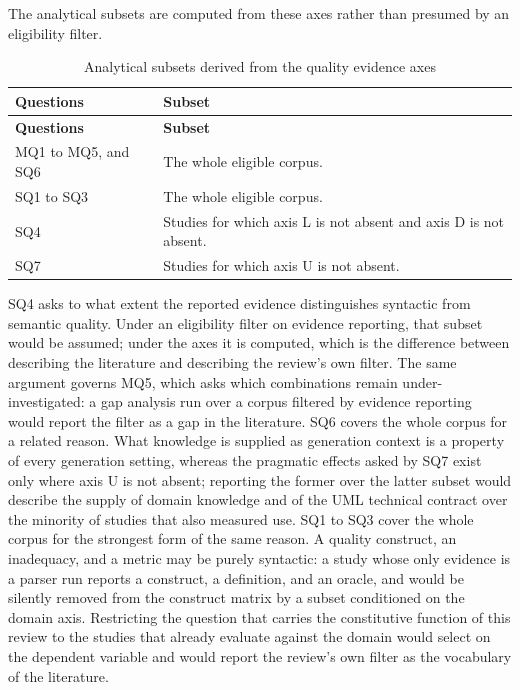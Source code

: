 The analytical subsets are computed from these axes rather than presumed by an eligibility filter.

\begin{longtable}{p{} p{}}
\caption{Analytical subsets derived from the quality evidence axes}
\label{tab:protocol_analytical_subsets}\\
\toprule
\textbf{Questions} & \textbf{Subset} \\
\midrule
\endfirsthead
\toprule
\textbf{Questions} & \textbf{Subset} \\
\midrule
\endhead
MQ1 to MQ5, and SQ6 & The whole eligible corpus. \\
SQ1 to SQ3 & The whole eligible corpus. \\
SQ4 & Studies for which axis L is not absent and axis D is not absent. \\
SQ7 & Studies for which axis U is not absent. \\
\bottomrule
\end{longtable}

SQ4 asks to what extent the reported evidence distinguishes syntactic from semantic quality. Under an eligibility filter on evidence reporting, that subset would be assumed; under the axes it is computed, which is the difference between describing the literature and describing the review's own filter. The same argument governs MQ5, which asks which combinations remain under-investigated: a gap analysis run over a corpus filtered by evidence reporting would report the filter as a gap in the literature. SQ6 covers the whole corpus for a related reason. What knowledge is supplied as generation context is a property of every generation setting, whereas the pragmatic effects asked by SQ7 exist only where axis U is not absent; reporting the former over the latter subset would describe the supply of domain knowledge and of the UML technical contract over the minority of studies that also measured use. SQ1 to SQ3 cover the whole corpus for the strongest form of the same reason. A quality construct, an inadequacy, and a metric may be purely syntactic: a study whose only evidence is a parser run reports a construct, a definition, and an oracle, and would be silently removed from the construct matrix by a subset conditioned on the domain axis. Restricting the question that carries the constitutive function of this review to the studies that already evaluate against the domain would select on the dependent variable and would report the review's own filter as the vocabulary of the literature.

